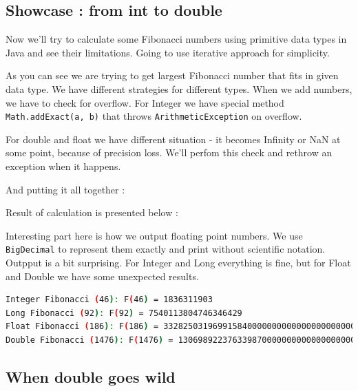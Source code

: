 \documentclass{article}
\begin{document}
\subsection{Showcase : from int to double}
Now we'll try to calculate some Fibonacci numbers using primitive data types in Java and see their limitations. Going to use iterative approach for simplicity.

As you can see we are trying to get largest Fibonacci number that fits in given data type. We have different strategies for different types.
When we add numbers, we have to check for overflow. For Integer we have special method \texttt{Math.addExact(a, b)} that throws \texttt{ArithmeticException} on overflow.

For double and float we have different situation - it becomes Infinity or NaN at some point, because of precision loss. We'll perfom this check and rethrow an exception when it happens.

And putting it all together :

Result of calculation is presented below :

Interesting part here is how we output floating point numbers. We use \texttt{BigDecimal} to represent them exactly and print without scientific notation.
Outpput is a bit surprising. For Integer and Long everything is fine, but for Float and Double we have some unexpected results.
\begin{lstlisting}[language=bash]
Integer Fibonacci (46): F(46) = 1836311903
Long Fibonacci (92): F(92) = 7540113804746346429
Float Fibonacci (186): F(186) = 332825031969915840000000000000000000000
Double Fibonacci (1476): F(1476) = 130698922376339870000000000000000000... // ton of zeros
\end{lstlisting}
\subsection{When double goes wild}
\end{document}
